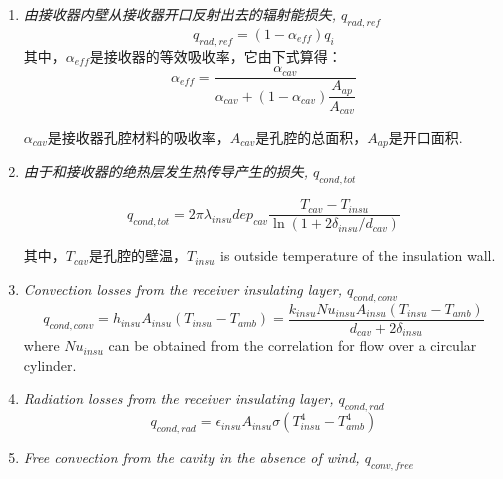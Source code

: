 \begin{enumerate}[label=(\arabic*)]
  \item \emph{由接收器内壁从接收器开口反射出去的辐射能损失, $q_{rad,ref}$}
  \begin{equation}
    q_{rad,ref}=(1-\alpha_{eff})q_{i}
\end{equation}
    其中，$\alpha_{eff}$是接收器的等效吸收率，它由下式算得：
    \begin{equation}
    \alpha_{eff}=\frac{\alpha_{cav}}{\alpha_{cav}+(1-\alpha_{cav})\dfrac{A_{ap}}{A_{cav}}}
    \end{equation}
    
    $\alpha_{cav}$是接收器孔腔材料的吸收率，$A_{cav}$是孔腔的总面积，$A_{ap}$是开口面积.
  \item \emph{由于和接收器的绝热层发生热传导产生的损失, $q_{cond,tot}$}
  
  \begin{equation}
q_{cond,tot}=2\pi\lambda_{insu}dep_{cav}\dfrac{T_{cav}-T_{insu}}{\ln(1 + 2\delta_{insu}/d_{cav})}
    \end{equation}
    
    其中，$T_{cav}$是孔腔的壁温，$T_{insu}$ is outside temperature of the insulation wall.

  \item \emph{Convection losses from the receiver insulating layer, $q_{cond,conv}$}  
  \begin{equation}
	q_{cond,conv}=h_{insu}A_{insu}(T_{insu}-T_{amb})
	=\dfrac{k_{insu}Nu_{insu}A_{insu}(T_{insu}-T_{amb})}{d_{cav}+2\delta_{insu}}
\end{equation}
where $Nu_{insu}$ can be obtained from the correlation for flow over a circular cylinder.~\cite{Churchill1977}

  \item \emph{Radiation losses from the receiver insulating layer, $q_{cond,rad}$}  
  \begin{equation}
	q_{cond,rad}=\epsilon_{insu}A_{insu}\sigma(T_{insu}^4 - T_{amb}^4)
\end{equation}
  \item \emph{Free convection from the cavity in the absence of wind, $q_{conv,free}$}
    

\end{enumerate}
